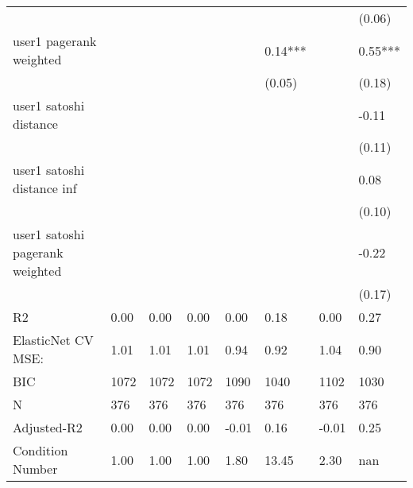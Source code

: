 \begin{table*}
\begin{center}
\begin{tabular}{llllllll}
                                               &          &            &         &         &          &                    & (0.06)   \\
user1 pagerank weighted                        &          &            &         &         & 0.14***  &                    & 0.55***  \\
                                               &          &            &         &         & (0.05)   &                    & (0.18)   \\
user1 satoshi distance                         &          &            &         &         &          &                    & -0.11    \\
                                               &          &            &         &         &          &                    & (0.11)   \\
user1 satoshi distance inf                     &          &            &         &         &          &                    & 0.08     \\
                                               &          &            &         &         &          &                    & (0.10)   \\
user1 satoshi pagerank weighted                &          &            &         &         &          &                    & -0.22    \\
                                               &          &            &         &         &          &                    & (0.17)   \\
R2                                             & 0.00     & 0.00       & 0.00    & 0.00    & 0.18     & 0.00               & 0.27     \\
ElasticNet CV MSE:                             & 1.01     & 1.01       & 1.01    & 0.94    & 0.92     & 1.04               & 0.90     \\
BIC                                            & 1072     & 1072       & 1072    & 1090    & 1040     & 1102               & 1030     \\
N                                              & 376      & 376        & 376     & 376     & 376      & 376                & 376      \\
Adjusted-R2                                    & 0.00     & 0.00       & 0.00    & -0.01   & 0.16     & -0.01              & 0.25     \\
Condition Number                               & 1.00     & 1.00       & 1.00    & 1.80    & 13.45    & 2.30               & nan      \\
\hline
\end{tabular}
\end{center}
\end{table*}
